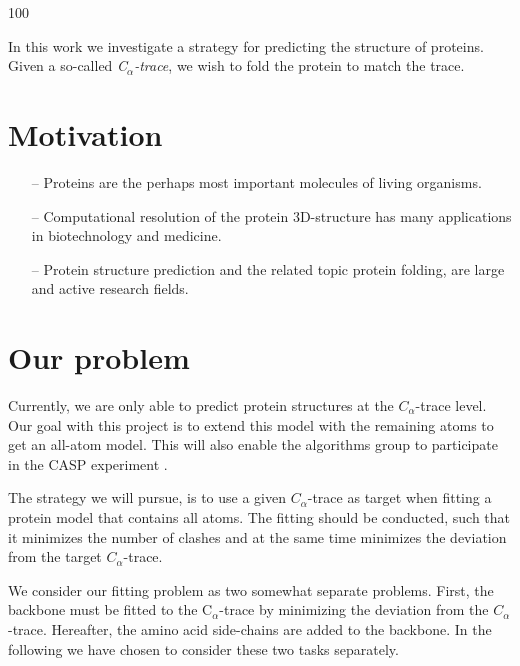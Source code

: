 \documentclass[a0,portrait]{a0poster}
\newcommand{\Ca}{C$_{\alpha}${}}
\begin{document}
\begin{GridBlock}{0}{21}{100}
\begin{multicols}{3}

In this work we investigate a strategy for predicting the structure of proteins. Given a so-called \emph{\Ca-trace}, we wish to fold the protein to match the trace.



\section{Motivation}
\begin{itemize}
    \item[-- ] Proteins are the perhaps most important molecules of
      living organisms.
    \item[-- ] Computational resolution of the protein 3D-structure has
      many applications in biotechnology and medicine.
    \item[-- ] Protein structure prediction and the related topic protein
      folding, are large and active research fields.
    \end{itemize}

\section{Our problem}
Currently, we are only able to predict protein structures at the $C_\alpha$-trace level. 
Our goal with this project is
to extend this model with the remaining atoms to get an all-atom
model.  This will also enable the algorithms group to participate in
the CASP experiment \cite{caspwebsite}.

The strategy we will pursue, is to use a given $C_\alpha$-trace as target when fitting a
protein model that contains all atoms. The fitting should be conducted,
such that it minimizes the number of clashes and at the same time
minimizes the deviation from the target $C_\alpha$-trace.

We consider our fitting problem as two somewhat separate problems.
First, the backbone must be fitted to the \Ca-trace by minimizing
the deviation from the $C_{\alpha}$-trace.  Hereafter, the amino acid
side-chains are added to the backbone.  In the following we have chosen to
consider these two tasks separately.


\end{multicols}
\end{GridBlock}
\end{document}
